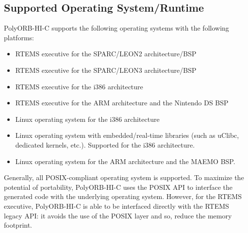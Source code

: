 \documentclass[11pt]{book}
\begin{document}
   \subsection{Supported Operating System/Runtime}
   PolyORB-HI-C supports the following operating systems with the following
   platforms:
   \begin{itemize}
      \item
         RTEMS executive for the SPARC/LEON2 architecture/BSP
      \item
         RTEMS executive for the SPARC/LEON3 architecture/BSP
      \item
         RTEMS executive for the i386 architecture
      \item
         RTEMS executive for the ARM architecture and the Nintendo DS BSP
      \item
         Linux operating system for the i386 architecture
      \item
         Linux operating system with embedded/real-time libraries (such as
         uClibc, dedicated kernels, etc.). Supported for the i386 architecture.
      \item
         Linux operating system for the ARM architecture and the MAEMO BSP.
   \end{itemize}

   Generally, all POSIX-compliant operating system is supported. To maximize
   the potential of portability, PolyORB-HI-C
   uses the POSIX API to interface the generated code with the underlying
   operating system. However, for the RTEMS executive, PolyORB-HI-C is able to
   be interfaced directly with the RTEMS legacy API: it avoids the use of the
   POSIX layer and so, reduce the memory footprint.
\end{document}
